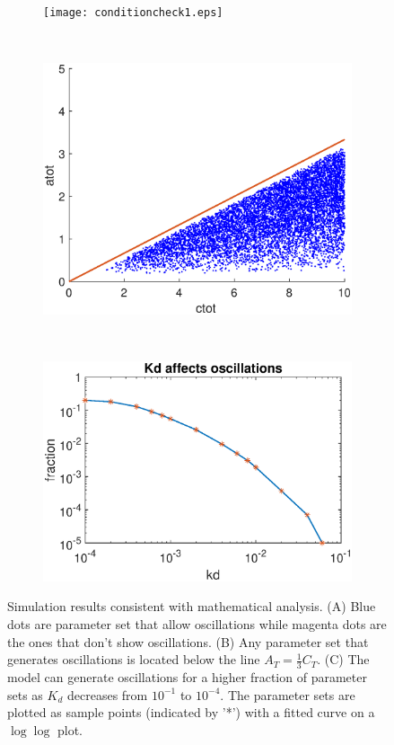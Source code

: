 \documentclass[a4paper,10pt]{article}
\numberwithin{equation}{section}
\begin{document}
\begin{figure}
\centering
\begin{subfigure}{0.49\textwidth}
\centering
\texttt{[image: conditioncheck1.eps]}
\caption{}\label{fig:conditioncheck1}
\end{subfigure}
~
\begin{subfigure}{0.49\textwidth}
\centering
\includegraphics[scale=0.4]{conditioncheck2.eps}
\caption{}\label{fig:conditioncheck2}
\end{subfigure}
~
\begin{subfigure}{0.8\textwidth}
\centering
\includegraphics[scale=0.6]{kd.eps}
\caption{}\label{fig:kd}
\end{subfigure}
\caption{ Simulation results consistent with mathematical analysis. (A) Blue dots are parameter set that allow oscillations while magenta dots are the ones that don't show oscillations. (B) Any parameter set that generates oscillations is located below the line $A_T=\frac{1}{3} C_T$. (C) The model can generate oscillations for a higher fraction of parameter sets as $K_d$ decreases from $10^{-1}$ to $10^{-4}$. The parameter sets are plotted as sample points (indicated by '*') with a fitted curve on a $\log\log$ plot.}
\end{figure}
\end{document}
